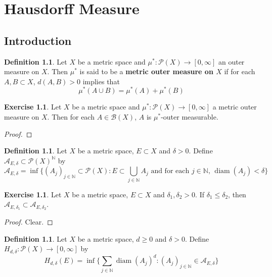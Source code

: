 \documentclass{book}
\theoremstyle{definition}
\newtheorem{defn}[definition]{Definition}
\newtheorem{ex}[definition]{Exercise}
\newcommand{\del}{\delta}
\newcommand{\N}{\mathbb{N}}
\newcommand{\MA}{\mathcal{A}}
\newcommand{\MB}{\mathcal{B}}
\newcommand{\MP}{\mathcal{P}}
\DeclareMathOperator{\diam}{diam}
\DeclareMathOperator*{\0}{\mbf{0}}
\DeclareMathOperator*{\1}{\mbf{1}}
\begin{document}
	
	
	
	
	
	\newpage
	\chapter{Hausdorff Measure}
	
	\section{Introduction}
	
	\begin{defn}
	Let $X$ be a metric space and $\mu^*: \MP(X) \rightarrow [0, \infty]$ an outer measure on $X$. Then $\mu^*$ is said to be a \textbf{metric outer measure on $X$} if for each $A, B \subset X$, $d(A,B) > 0$ implies that 
	\begin{equation*}
	\mu^*(A \cup B) = \mu^*(A) + \mu^*(B)
	\end{equation*}
	\end{defn}	
	
	\begin{ex}
	Let $X$ be a metric space and $\mu^*: \MP(X) \rightarrow [0, \infty]$ a metric outer measure on $X$.
	Then for each $A \in \MB(X)$, $A$ is $\mu^*$-outer measurable. 
	\end{ex}
	
	\begin{proof}
	
	\end{proof}
	
	
	\begin{defn}
	Let $X$ be a metric space, $E \subset X$ and $\del >0$. Define $\MA_{E, \del} \subset \MP(X)^{\N}$ by 
	\begin{equation*}
	 \MA_{E, \del} = \inf \bigg \{(A_j)_{j \in \N} \subset \MP(X): E \subset \bigcup\limits_{j \in \N}A_j \text{ and for each $j \in \N$, } \diam(A_j) < \del \bigg \}
	\end{equation*}
	\end{defn}
	
	\begin{ex}
	Let $X$ be a metric space, $E \subset X$ and $\del_1, \del_2 >0$. If $\del_1 \leq \del_2$, then $\MA_{E, \del_1} \subset \MA_{E, \del_2}$.
	\end{ex}
	
	\begin{proof}
	Clear.
	\end{proof}
	
	\begin{defn}
	Let $X$ be a metric space, $d \geq 0$ and $\del >0$. Define $H_{d, \del}: \MP(X) \rightarrow [0, \infty]$ by 
	\begin{equation*}
	H_{d, \del}(E) = \inf \bigg \{\sum_{j \in \N} \diam(A_j)^d: (A_j)_{j \in \N} \in \MA_{E, \del} \bigg \}
	\end{equation*}
	\end{defn}
	
\end{document}
